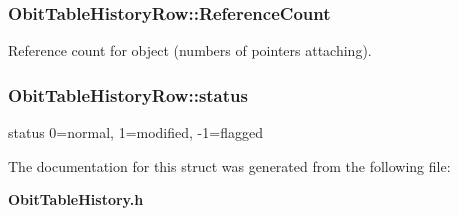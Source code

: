 \subsubsection{ {\bf Obit\-Table\-History\-Row::Reference\-Count}}\label{structObitTableHistoryRow_o2}


Reference count for object (numbers of pointers attaching). 

\subsubsection{ {\bf Obit\-Table\-History\-Row::status}}\label{structObitTableHistoryRow_o7}


status 0=normal, 1=modified, -1=flagged 



The documentation for this struct was generated from the following file:\begin{CompactItemize}
\item 
{\bf Obit\-Table\-History.h}\end{CompactItemize}
